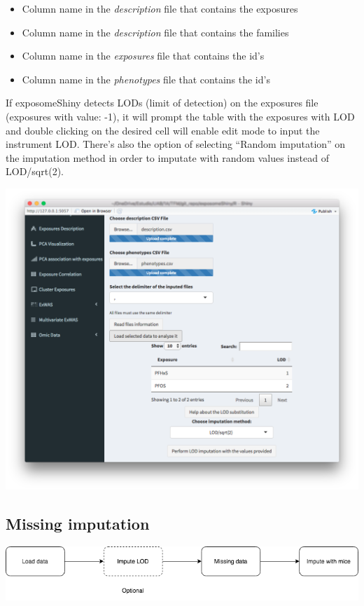\documentclass[
]{book}
\providecommand{\tightlist}{%
  \setlength{\itemsep}{0pt}\setlength{\parskip}{0pt}}
\begin{document}
\begin{itemize}
\tightlist
\item
  Column name in the \emph{description} file that contains the exposures
\item
  Column name in the \emph{description} file that contains the families\\
\item
  Column name in the \emph{exposures} file that contains the id's
\item
  Column name in the \emph{phenotypes} file that contains the id's
\end{itemize}

If exposomeShiny detects LODs (limit of detection) on the exposures file (exposures with value: -1), it will prompt the table with the exposures with LOD and double clicking on the desired cell will enable edit mode to input the instrument LOD. There's also the option of selecting ``Random imputation'' on the imputation method in order to imputate with random values instead of LOD/sqrt(2).

\includegraphics{images/analysis1_3.png}

\hypertarget{missing-imputation}{%
\subsection{Missing imputation}\label{missing-imputation}}

\includegraphics{images/analysis2_1.png}
\end{document}
